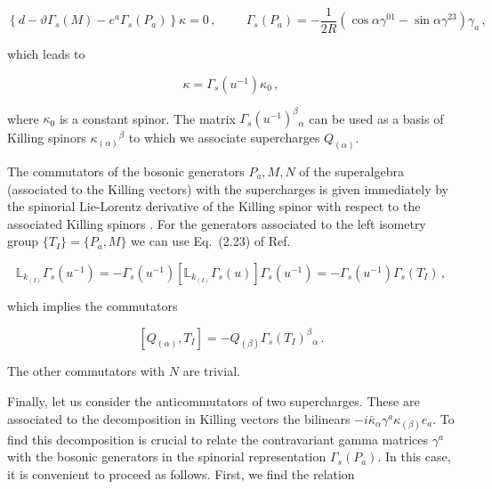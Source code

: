 \documentclass[12pt,a4paper]{article}
\begin{document}
\begin{equation}
\left\{d -\vartheta\Gamma_{s}(M)  -e^{a}\Gamma_{s}(P_{a})\right\}\kappa=0\, ,
\hspace{1cm}
\Gamma_{s}(P_{a}) = -{\textstyle\frac{1}{2R}}
(\cos{\alpha} \gamma^{01} -\sin{\alpha}\gamma^{23}) \gamma_{a}\, ,
\end{equation}

\noindent
which leads to

\begin{equation}
\kappa = \Gamma_{s}(u^{-1})\kappa_{0}\, ,
\end{equation}

\noindent
where $\kappa_{0}$ is a constant spinor. The matrix
$\Gamma_{s}(u^{-1})^{\beta}{}_{\alpha}$ can be used as a basis of
Killing spinors $\kappa_{(\alpha)}{}^{\beta}$ to which we associate
supercharges $Q_{(\alpha)}$.

The commutators of the bosonic generators $P_{a},M,N$ of the
superalgebra (associated to the Killing vectors) with the supercharges
is given immediately by the spinorial Lie-Lorentz derivative of the
Killing spinor with respect to the associated Killing spinors
\cite{Figueroa-O'Farrill:1999va,Ortin:2002qb}. For the generators
associated to the left isometry group $\{T_{I}\}=\{P_{a},M\}$ we can
use Eq.~(2.23) of Ref.~\cite{Alonso-Alberca:2002gh}

\begin{equation}
\mathbb{L}_{k_{(I)}} \Gamma_{s}(u^{-1}) =
-\Gamma_{s}(u^{-1}) 
[\mathbb{L}_{k_{(I)}} \Gamma_{s}(u)] \Gamma_{s}(u^{-1}) = 
-\Gamma_{s}(u^{-1}) \Gamma_{s}(T_{I})\, ,
\end{equation}

\noindent 
which implies the commutators

\begin{equation}
\label{eq:QTcommutators}
[Q_{(\alpha)},T_{I}] = -Q_{(\beta)}  \Gamma_{s}(T_{I})^{\beta}{}_{\alpha}\, .
\end{equation}

The other commutators with $N$ are trivial.

Finally, let us consider the anticommutators of two supercharges.
These are associated to the decomposition in Killing vectors the
bilinears $-i\bar{\kappa}_{\alpha}\gamma^{a}\kappa_{(\beta)}e_{a}$.
To find this decomposition is crucial to relate the contravariant
gamma matrices $\gamma^{a}$ with the bosonic generators in the
spinorial representation $\Gamma_{s}(P_{a})$. In this case, it is
convenient to proceed as follows. First, we find the relation
\end{document}
